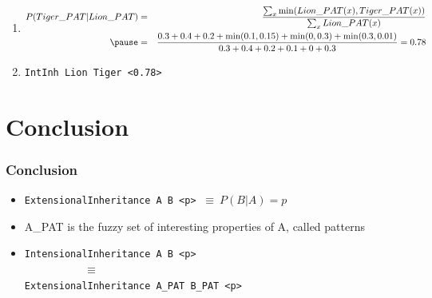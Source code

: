 \documentclass{beamer}
\begin{document}
{\begin{enumerate}
\begin{columns}
  \end{columns}

  \item<+->

    {\tiny
      \begin{eqnarray*}
        P(Tiger\_PAT|Lion\_PAT)
        &
        =
        &
        \frac{\sum_x \min(Lion\_PAT(x), Tiger\_PAT(x))}
        {\sum_x Lion\_PAT(x)}\\
        \pause
        &
        =
        & 
        \frac{0.3+0.4+0.2+\min(0.1,0.15)+\min(0,0.3)+\min(0.3,0.01)}
        {0.3+0.4+0.2+0.1+0+0.3} = 0.78
      \end{eqnarray*}
    }

  \item<+->
      \alert{{\tt IntInh Lion Tiger <0.78>}}
  \end{enumerate}

}

\section{Conclusion}

\frame
{
  \frametitle{Conclusion}
  \begin{itemize}
  \item<+-> {\tt ExtensionalInheritance A B <p>} $\ \equiv\ P(B|A)=p$
  \item<+-> A\_PAT is the fuzzy set of \alert{interesting properties} of A,
    called \alert{patterns}
  \item<+-> {\tt IntensionalInheritance A B <p>}\\
    $\ \ \ \ \ \ \ \ \ \ \ \ \ \ \ \ \ \ \ \ \ \ \ \ \equiv$\\
    {\tt ExtensionalInheritance A\_PAT B\_PAT <p>}
  \end{itemize}
    
}
\end{document}
